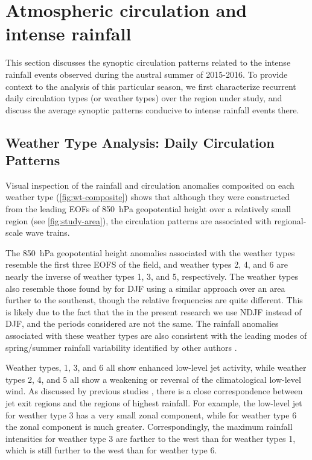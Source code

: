\documentclass{ametsoc}
\begin{document}

\section{Atmospheric circulation and intense rainfall} \label{sec:diag}

This section discusses the synoptic circulation patterns related to the intense rainfall events observed during the austral summer of 2015-2016. To provide context to the analysis of this particular season, we first characterize recurrent daily circulation types (or weather types) over the region under study, and discuss the average synoptic patterns conducive to intense rainfall events there.

\subsection{Weather Type Analysis: Daily Circulation Patterns} \label{sec:weather-types}

Visual inspection of the rainfall and circulation anomalies composited on each weather type (\cref{fig:wt-composite}) shows that although they were constructed from the leading EOFs of \SI{850}{\hecto\pascal} geopotential height over a relatively small region (see \cref{fig:study-area}), the circulation patterns are associated with regional-scale wave trains.

The \SI{850}{\hecto\pascal} geopotential height anomalies associated with the weather types resemble the first three EOFS of the field, and weather types 2, 4, and 6 are nearly the inverse of weather types 1, 3, and 5, respectively.
The weather types also resemble those found by \citet{Munoz2015} for DJF using a similar approach over an area further to the southeast, though the relative frequencies are quite different.
This is likely due to the fact that the in the present research we use NDJF instead of DJF, and the periods considered are not the same.
The rainfall anomalies associated with these weather types are also consistent with the leading modes of spring/summer rainfall variability identified by other authors \citep{Grimm:2009bq}.

Weather types, 1, 3, and 6 all show enhanced low-level jet activity, while weather types 2, 4, and 5 all show a weakening or reversal of the climatological low-level wind.
As discussed by previous studies \citep{Saulo:2007km,Salio:2007gd,Marengo2004,Velasco1987}, there is a close correspondence between jet exit regions and the regions of highest rainfall.
For example, the low-level jet for weather type 3 has a very small zonal component, while for weather type 6 the zonal component is much greater.
Correspondingly, the maximum rainfall intensities for weather type 3 are farther to the west than for weather types 1, which is still further to the west than for weather type 6.
\end{document}
